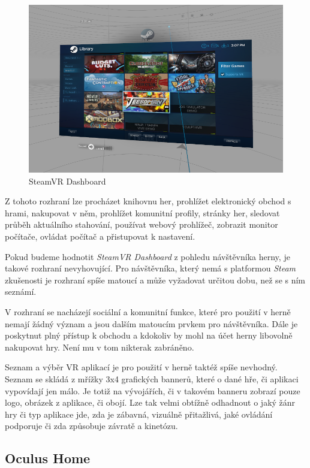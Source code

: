\begin{figure}
\centering
\includegraphics[width=12cm]{src/assets/steamvr-library.png}
\caption{SteamVR Dashboard}
\end{figure}

Z tohoto rozhraní lze procházet knihovnu her, prohlížet elektronický
obchod s hrami, nakupovat v něm, prohlížet komunitní profily, stránky
her, sledovat průběh aktuálního stahování, používat webový prohlížeč,
zobrazit monitor počítače, ovládat počítač a přistupovat k nastavení.

Pokud budeme hodnotit \emph{SteamVR Dashboard} z pohledu návštěvníka
herny, je takové rozhraní nevyhovující. Pro návštěvníka, který nemá s
platformou \emph{Steam} zkušenosti je rozhraní spíše matoucí a může
vyžadovat určitou dobu, než se s ním seznámí. 

V rozhraní se nacházejí
sociální a komunitní funkce, které pro použití v herně nemají žádný
význam a jsou dalším matoucím prvkem pro návštěvníka. Dále je poskytnut
plný přístup k obchodu a kdokoliv by mohl na účet herny libovolně
nakupovat hry. Není mu v tom nikterak zabráněno.

Seznam a výběr VR aplikací je pro použití v herně taktéž spíše nevhodný.
Seznam se skládá z mřížky 3x4 grafických bannerů, které o dané hře, či aplikaci 
vypovídají jen málo. Je totiž na vývojářích, či v takovém banneru
zobrazí pouze logo, obrázek z aplikace, či obojí. Lze tak velmi obtížně
odhadnout o jaký žánr hry či typ aplikace jde, zda je zábavná, vizuálně přitažlivá, jaké
ovládání podporuje či zda způsobuje závratě a kinetózu.

\subsection{Oculus Home}\label{oculus-home}


